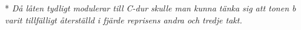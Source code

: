 \vspace{5mm}
* \textit{
Då låten tydligt modulerar till C-dur skulle man
kunna tänka sig att tonen b varit tillfälligt återställd i fjärde reprisens
andra och tredje takt.
}

